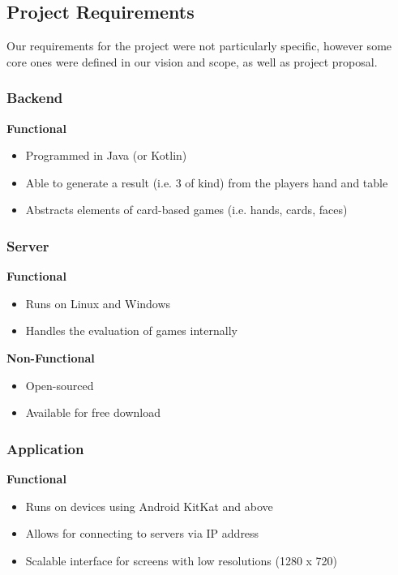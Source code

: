 \documentclass[11pt]{article}
\begin{document}
\subsection{Project Requirements}
Our requirements for the project were not particularly specific, however some core ones were defined in our vision and scope, as well as project proposal. 

\subsubsection{Backend}
\textbf{Functional}
\begin{itemize}
	\item Programmed in Java (or Kotlin)
	\item Able to generate a result (i.e. 3 of kind) from the players hand and table
	\item Abstracts elements of card-based games (i.e. hands, cards, faces)
\end{itemize}
%	

\subsubsection{Server}
\textbf{Functional}
\begin{itemize}
	\item Runs on Linux and Windows
	\item Handles the evaluation of games internally
\end{itemize}

\textbf{Non-Functional}
\begin{itemize}
	\item Open-sourced
	\item Available for free download
\end{itemize}

\subsubsection{Application}

\textbf{Functional}
\begin{itemize}
	\item Runs on devices using Android KitKat and above
	\item Allows for connecting to servers via IP address
	\item Scalable interface for screens with low resolutions (1280 x 720)
\end{itemize}
\end{document}
